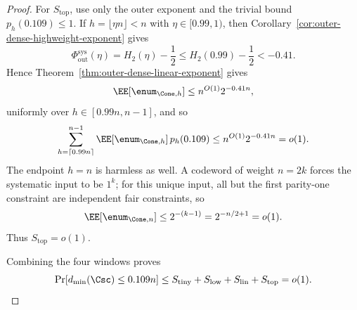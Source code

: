 \begin{proof}
For \(S_{\mathrm{top}}\), use only the outer exponent and the trivial bound \(p_h(0.109)\le 1\).
If \(h=\lfloor \eta n\rfloor<n\) with \(\eta\in[0.99,1)\), then Corollary~\ref{cor:outer-dense-highweight-exponent} gives
\[
\Phi_{\mathrm{out}}^{\mathrm{sys}}(\eta)=H_2(\eta)-\frac12
\le
H_2(0.99)-\frac12
< -0.41.
\]
Hence Theorem~\ref{thm:outer-dense-linear-exponent} gives
\[
\EE[\enum_{\Cone,h}]
\le
n^{O(1)}2^{-0.41n},
\]
uniformly over \(h\in[0.99n,n-1]\), and so
\[
\sum_{h=\lceil0.99n\rceil}^{n-1}\EE[\enum_{\Cone,h}]\,p_h(0.109)
\le
n^{O(1)}2^{-0.41n}
=
o(1).
\]
The endpoint \(h=n\) is harmless as well.  A codeword of weight \(n=2k\)
forces the systematic input to be \(1^k\); for this unique input, all but the
first parity-one constraint are independent fair constraints, so
\[
\EE[\enum_{\Cone,n}]\le 2^{-(k-1)}=2^{-n/2+1}=o(1).
\]
Thus \(S_{\mathrm{top}}=o(1)\).

Combining the four windows proves
\[
\Pr[d_{\min}(\Csc)\le 0.109 n]
\le
S_{\mathrm{tiny}}+S_{\mathrm{low}}+S_{\mathrm{lin}}+S_{\mathrm{top}}
=
o(1).
\]
\end{proof}

